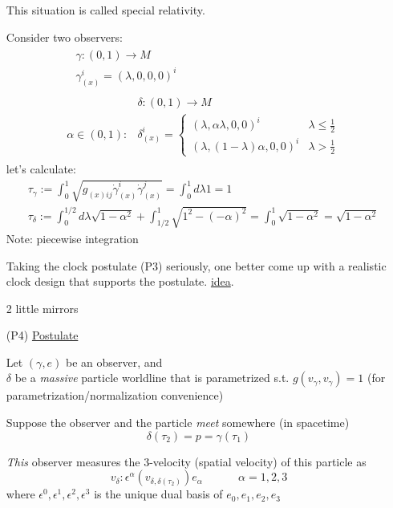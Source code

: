 \documentclass[10pt, twoside]{amsart}
\begin{document}
\begin{multicols*}{2}
\begin{enumerate}
This situation is called special relativity.

Consider two observers: 
\[
\begin{aligned} & 
\begin{aligned}
& \gamma : (0,1) \to M \\ 
 & \gamma_{(x)}^i = (\lambda , 0 ,0  ,0 )^i \end{aligned} \\
& 
\begin{aligned}
  & \delta :(0,1) \to M \\
\alpha \in (0,1) :   & \delta_{(x)}^i = \begin{cases} ( \lambda , \alpha \lambda , 0 , 0)^i & \lambda \leq \frac{1}{2} \\ 
    (\lambda, (1-\lambda)\alpha, 0,0)^i & \lambda > \frac{1}{2} \end{cases}
\end{aligned}
\end{aligned}
\]
let's calculate:
\[
\begin{aligned}
  & \tau_{\gamma}:= \int_0^1 \sqrt{ g_{(x)ij} \dot{\gamma}^i_{(x)} \dot{\gamma}^j_{(x)} } = \int_0^1 d\lambda 1 = 1 \\
  & \tau_{\delta} := \int_0^{1/2} d\lambda \sqrt{ 1- \alpha^2} + \int_{1/2}^1 \sqrt{ 1^2 - (-\alpha)^2 } = \int_0^1 \sqrt{ 1 - \alpha^2 } = \sqrt{ 1 - \alpha^2}
\end{aligned}
\]
Note: piecewise integration

Taking the clock postulate (P3) seriously, one better come up with a realistic clock design that supports the postulate. 
\underline{idea}.

2 little mirrors
\item[(P4)] \underline{Postulate}

Let $(\gamma, e)$ be an observer, and \\
$\delta$ be a \emph{massive} particle worldline that is parametrized s.t. $g(v_{\gamma}, v_{\gamma})=1$ (for parametrization/normalization convenience)

Suppose the observer and the particle \emph{meet} somewhere (in spacetime)
\[
\delta(\tau_2) = p = \gamma(\tau_1)
\]

\emph{This} observer measures the 3-velocity (spatial velocity) of this particle as 
\begin{equation}\label{Eq:spatialv}
v_{\delta}: \epsilon^{\alpha}( v_{\delta, \delta(\tau_2)} ) e_{\alpha} \quad \quad \quad \, \alpha =1,2,3
\end{equation}
where $\epsilon^0, \boxed{ \epsilon^1,\epsilon^2,\epsilon^3}$ is the unique dual basis of $e_0,\boxed{ e_1,e_2,e_3}$
\end{enumerate}


\end{multicols*}
\end{document}
